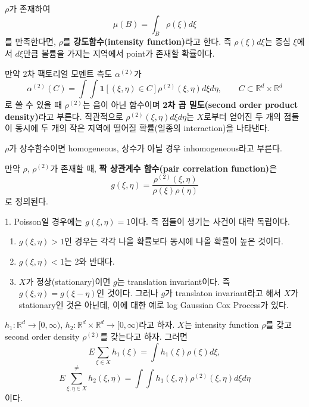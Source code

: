 \documentclass[b5paper,]{scrbook}
\theoremstyle{plain}
\theoremstyle{definition}
\numberwithin{equation}{section}
\let\BeginKnitrBlock\begin \let\EndKnitrBlock\end
\begin{document}
\BeginKnitrBlock{definition}[강도함수]
\protect\hypertarget{def:unnamed-chunk-415}{}{\label{def:unnamed-chunk-415} {} }\(\rho\)가 존재하여
\[\mu(B)=\int_{B}\rho(\xi)d\xi\]
를 만족한다면, \(\rho\)를 \textbf{강도함수(intensity function)}라고 한다. 즉 \(\rho(\xi)d\xi\)는 중심 \(\xi\)에서 \(d\xi\)만큼 볼륨을 가지는 지역에서 point가 존재할 확률이다.
\EndKnitrBlock{definition}

\BeginKnitrBlock{definition}[2차 곱 밀도]
\protect\hypertarget{def:unnamed-chunk-416}{}{\label{def:unnamed-chunk-416} {} }만약 2차 팩토리얼 모멘트 측도 \(\alpha^{(2)}\)가
\[\alpha^{(2)}(C)=\int \int \mathbf{1}[(\xi,\eta)\in C]\rho^{(2)}(\xi,\eta)d\xi d\eta, \qquad{C\subset \mathbb{R}^{d}\times\mathbb{R}^{d}}\]
로 쓸 수 있을 때 \(\rho^{(2)}\)는 음이 아닌 함수이며 \textbf{2차 곱 밀도(second order product density)}라고 부른다. 직관적으로 \(\rho^{(2)}(\xi, \eta)d\xi d\eta\)는 \(X\)로부터 얻어진 두 개의 점들이 동시에 두 개의 작은 지역에 떨어질 확률(일종의 interaction)을 나타낸다.
\EndKnitrBlock{definition}

\(\rho\)가 상수함수이면 homogeneous, 상수가 아닐 경우 inhomogeneous라고 부른다.

\BeginKnitrBlock{definition}[짝 상관계수 함수]
\protect\hypertarget{def:unnamed-chunk-417}{}{\label{def:unnamed-chunk-417} {} }만약 \(\rho\), \(\rho^{(2)}\)가 존재할 때, \textbf{짝 상관계수 함수(pair correlation function)}은
\[g(\xi,\eta)=\frac{\rho^{(2)}(\xi,\eta)}{\rho(\xi)\rho(\eta)}\]
로 정의된다.
\EndKnitrBlock{definition}

\BeginKnitrBlock{remark}
{}1. Poisson일 경우에는 \(g(\xi,\eta)=1\)이다. 즉 점들이 생기는 사건이 대략 독립이다.

\begin{enumerate}
\def\labelenumi{\arabic{enumi}.}
\setcounter{enumi}{1}
\item
  \(g(\xi,\eta)>1\)인 경우는 각각 나올 확률보다 동시에 나올 확률이 높은 것이다.
\item
  \(g(\xi,\eta)<1\)는 2와 반대다.
\item
  \(X\)가 정상(stationary)이면 \(g\)는 translation invariant이다. 즉 \(g(\xi, \eta)=g(\xi-\eta)\)인 것이다. 그러나 \(g\)가 translaton invariant라고 해서 \(X\)가 stationary인 것은 아닌데, 이에 대한 예로 log Gaussian Cox Process가 있다.
\end{enumerate}
\EndKnitrBlock{remark}

\BeginKnitrBlock{proposition}
\protect\hypertarget{prp:unnamed-chunk-419}{}{\label{prp:unnamed-chunk-419} }\(h_{1}:\mathbb{R}^{d}\rightarrow [0,\infty)\), \(h_{2}:\mathbb{R}^{d}\times \mathbb{R}^{d}\rightarrow [0,\infty)\)라고 하자. \(X\)는 intensity function \(\rho\)를 갖고 second order density \(\rho^{(2)}\)를 갖는다고 하자. 그러면
\[E\sum_{\xi\in X}h_{1}(\xi)=\int h_{1}(\xi)\rho(\xi)d\xi,\]
\[E\sum_{\xi,\eta\in X}^{\neq}h_{2}(\xi,\eta)=\int\int h_{1}(\xi,\eta)\rho^{(2)}(\xi,\eta)d\xi d\eta\]
이다.
\EndKnitrBlock{proposition}
\end{document}
